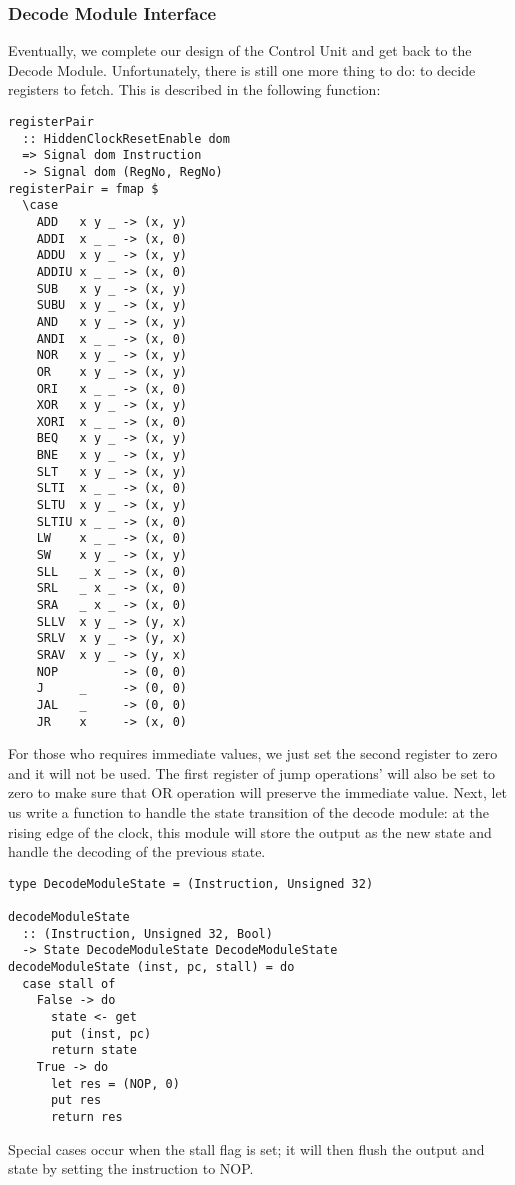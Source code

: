 \subsubsection{Decode Module Interface}
Eventually, we complete our design of the Control Unit and get back to the Decode Module. Unfortunately, there is still one more thing to do: to decide registers to fetch. This is described in the following function:
\begin{verbatim}
registerPair 
  :: HiddenClockResetEnable dom
  => Signal dom Instruction
  -> Signal dom (RegNo, RegNo)
registerPair = fmap $
  \case
    ADD   x y _ -> (x, y)
    ADDI  x _ _ -> (x, 0)
    ADDU  x y _ -> (x, y)
    ADDIU x _ _ -> (x, 0)
    SUB   x y _ -> (x, y)
    SUBU  x y _ -> (x, y)
    AND   x y _ -> (x, y)
    ANDI  x _ _ -> (x, 0)
    NOR   x y _ -> (x, y)
    OR    x y _ -> (x, y)
    ORI   x _ _ -> (x, 0)
    XOR   x y _ -> (x, y)
    XORI  x _ _ -> (x, 0)
    BEQ   x y _ -> (x, y)
    BNE   x y _ -> (x, y)
    SLT   x y _ -> (x, y)
    SLTI  x _ _ -> (x, 0)
    SLTU  x y _ -> (x, y)
    SLTIU x _ _ -> (x, 0)
    LW    x _ _ -> (x, 0)
    SW    x y _ -> (x, y)
    SLL   _ x _ -> (x, 0)
    SRL   _ x _ -> (x, 0)
    SRA   _ x _ -> (x, 0)
    SLLV  x y _ -> (y, x)
    SRLV  x y _ -> (y, x)
    SRAV  x y _ -> (y, x)
    NOP         -> (0, 0)
    J     _     -> (0, 0)
    JAL   _     -> (0, 0)
    JR    x     -> (x, 0)
\end{verbatim}
For those who requires immediate values, we just set the second register to zero and it will not be used. The first register of jump operations' will also be set to zero to make sure that OR operation will preserve the immediate value.
Next, let us write a function to handle the state transition of the decode module: at the rising edge of the clock, this module will store the output as the new state and handle the decoding of the previous state.
\begin{verbatim}
type DecodeModuleState = (Instruction, Unsigned 32)

decodeModuleState 
  :: (Instruction, Unsigned 32, Bool)
  -> State DecodeModuleState DecodeModuleState
decodeModuleState (inst, pc, stall) = do
  case stall of
    False -> do
      state <- get
      put (inst, pc)
      return state
    True -> do
      let res = (NOP, 0)
      put res
      return res
\end{verbatim}
Special cases occur when the stall flag is set; it will then flush the output and state by setting the instruction to NOP.
